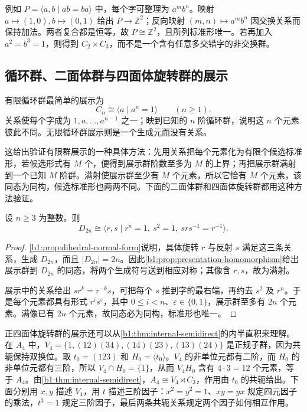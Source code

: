 \ProseParagraphBreak
例如 \(P=\langle a,b\mid ab=ba\rangle\) 中，每个字可整理为 \(a^mb^n\)。映射 \(a\mapsto(1,0),b\mapsto(0,1)\) 给出 \(P\to\mathbb Z^2\)；反向映射 \((m,n)\mapsto a^mb^n\) 因交换关系而保持加法。两者复合都是恒等，故 \(P\cong\mathbb Z^2\)，且所列标准形唯一。若再加入 \(a^2=b^3=1\)，则得到 \(C_2\times C_3\)，而不是一个含有任意多交错字的非交换群。

\subsection{循环群、二面体群与四面体旋转群的展示}
\label{b1:subsec:0802:03}

有限循环群最简单的展示为
\[
	C_n\cong\langle a\mid a^n=1\rangle\qquad(n\ge1).
\]
关系使每个字成为 \(1,a,\ldots,a^{n-1}\) 之一；映到已知的 \(n\) 阶循环群，说明这 \(n\) 个元素彼此不同。无限循环群展示则是一个生成元而没有关系。

\ProseParagraphBreak
这给出验证有限群展示的一种具体方法：先用关系把每个元素化为有限个候选标准形，若候选形式有 \(M\) 个，便得到展示群阶数至多为 \(M\) 的上界；再把展示群满射到一个已知 \(M\) 阶群。满射使展示群至少有 \(M\) 个元素，所以它恰有 \(M\) 个元素，该同态为同构，候选标准形也两两不同。下面的二面体群和四面体旋转群都用这种方法验证。

\begin{proposition}[二面体群的展示]\label{b1:prop:dihedral-presentation}
	设 \(n\geq3\) 为整数。则
	\[
		D_{2n}\cong\langle r,s\mid r^n=1,\ s^2=1,\ srs^{-1}=r^{-1}\rangle.
	\]
\end{proposition}
\begin{proof}
	\cref{b1:prop:dihedral-normal-form}说明，具体旋转 \(r\) 与反射 \(s\) 满足这三条关系，生成 \(D_{2n}\)，而且 \(|D_{2n}|=2n\)。因此\cref{b1:prop:presentation-homomorphism}给出展示群到 \(D_{2n}\) 的同态，将两个生成符号送到相应对称；其像含 \(r,s\)，故为满射。

	展示中的关系给出 \(sr^k=r^{-k}s\)，可把每个 \(s\) 推到字的最右端，再约去 \(s^2\) 及 \(r^n\)。于是每个元素都具有形式 \(r^i s^\varepsilon\)，其中 \(0\le i<n\)、\(\varepsilon\in\{0,1\}\)，展示群至多有 \(2n\) 个元素。满像已有 \(2n\) 个元素，故同态必为同构，标准形也唯一。
\end{proof}

正四面体旋转群的展示还可以从\cref{b1:thm:internal-semidirect}的内半直积来理解。在 \(A_4\) 中，\(V_4=\{1,(12)(34),(14)(23),(13)(24)\}\) 是正规子群，因为共轭保持双换位。取 \(t_0=(123)\) 和 \(H_0=\langle t_0\rangle\)。\(V_4\) 的非单位元都有二阶，而 \(H_0\) 的非单位元都有三阶，所以 \(V_4\cap H_0=\{1\}\)，从而 \(V_4H_0\) 含有 \(4\cdot3=12\) 个元素，等于 \(A_4\)。由\cref{b1:thm:internal-semidirect}，\(A_4\cong V_4\rtimes C_3\)，作用由 \(t_0\) 的共轭给出。下面分别用 \(x,y\) 描述 \(V_4\)，用 \(t\) 描述三阶因子：\(x^2=y^2=1\)、\(xy=yx\) 规定四元因子的乘法，\(t^3=1\) 规定三阶因子，最后两条共轭关系规定两个因子如何相互作用。

